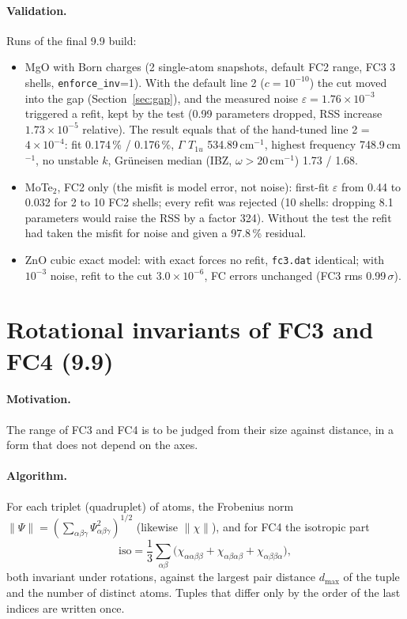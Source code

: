 \documentclass[11pt,a4paper]{article}
\newcommand{\code}[1]{\texttt{#1}}
\begin{document}
\paragraph{Validation.} Runs of the final 9.9 build:
\begin{itemize}
\item MgO with Born charges (2 single-atom snapshots, default FC2 range, FC3 3 shells, \code{enforce\_inv}=1).
With the default line 2 ($c=10^{-10}$) the cut moved into the gap (Section~\ref{sec:gap}), and the measured
noise $\varepsilon=1.76\times10^{-3}$ triggered a refit, kept by the test (0.99 parameters dropped, RSS increase
$1.73\times10^{-5}$ relative). The result equals that of the hand-tuned line 2 = $4\times10^{-4}$: fit 0.174\,\% /
0.176\,\%, $\Gamma$ $T_{1u}$ 534.89\,cm$^{-1}$, highest frequency 748.9\,cm$^{-1}$, no unstable $k$, Gr\"uneisen
median (IBZ, $\omega>20$\,cm$^{-1}$) 1.73 / 1.68.
\item MoTe$_2$, FC2 only (the misfit is model error, not noise): first-fit $\varepsilon$ from 0.44 to 0.032 for
2 to 10 FC2 shells; every refit was rejected (10 shells: dropping 8.1 parameters would raise the RSS by a
factor 324). Without the test the refit had taken the misfit for noise and given a 97.8\,\% residual.
\item ZnO cubic exact model: with exact forces no refit, \code{fc3.dat} identical; with $10^{-3}$ noise, refit to
the cut $3.0\times10^{-6}$, FC errors unchanged (FC3 rms 0.99\,$\sigma$).
\end{itemize}

\section{Rotational invariants of FC3 and FC4 (9.9)}
\paragraph{Motivation.} The range of FC3 and FC4 is to be judged from their size against distance, in a
form that does not depend on the axes.

\paragraph{Algorithm.} For each triplet (quadruplet) of atoms, the Frobenius norm
$\|\Psi\|=(\sum_{\alpha\beta\gamma}\Psi_{\alpha\beta\gamma}^2)^{1/2}$ (likewise $\|\chi\|$), and for FC4 the
isotropic part
\begin{equation}
\mathrm{iso}=\frac13\sum_{\alpha\beta}\big(\chi_{\alpha\alpha\beta\beta}+\chi_{\alpha\beta\alpha\beta}+\chi_{\alpha\beta\beta\alpha}\big),
\end{equation}
both invariant under rotations, against the largest pair distance $d_{\max}$ of the tuple and the number of
distinct atoms. Tuples that differ only by the order of the last indices are written once.
\end{document}
